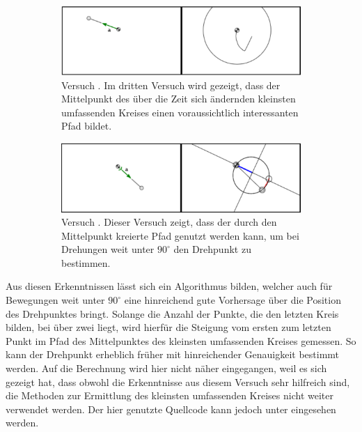 \begin{figure}
    \centering
    \begin{subfigure}[t]{0.45\textwidth}
        \includegraphics[width=\textwidth]{gfx/pendel1_3.png}
        \caption{Versuch . Im dritten Versuch wird gezeigt, dass der Mittelpunkt des über die Zeit sich ändernden kleinsten umfassenden Kreises einen voraussichtlich interessanten Pfad bildet.}\label{fig:pendel1_3}
    \end{subfigure}
    \begin{subfigure}[t]{0.45\textwidth}
        \includegraphics[width=\textwidth]{gfx/pendel1_4.png}
        \caption{Versuch . Dieser Versuch zeigt, dass der durch den Mittelpunkt kreierte Pfad genutzt werden kann, um bei Drehungen weit unter $90^\circ$ den Drehpunkt zu bestimmen.}\label{fig:pendel1_4}
    \end{subfigure}
    \caption[Versuche  und ]{}
    \label{fig:pendel1_3_4}
\end{figure}

Aus diesen Erkenntnissen lässt sich ein Algorithmus bilden, welcher auch für Bewegungen weit unter $90^\circ$ eine hinreichend gute Vorhersage über die Position des Drehpunktes bringt.
Solange die Anzahl der Punkte, die den letzten Kreis bilden, bei über zwei liegt, wird hierfür die Steigung vom ersten zum letzten Punkt im Pfad des Mittelpunktes des kleinsten umfassenden Kreises gemessen.
So kann der Drehpunkt erheblich früher mit hinreichender Genauigkeit bestimmt werden.
Auf die Berechnung wird hier nicht näher eingegangen, weil es sich gezeigt hat, dass obwohl die Erkenntnisse aus diesem Versuch sehr hilfreich sind, die Methoden zur Ermittlung des kleinsten umfassenden Kreises nicht weiter verwendet werden.
Der hier genutzte Quellcode kann jedoch unter  eingesehen werden.

